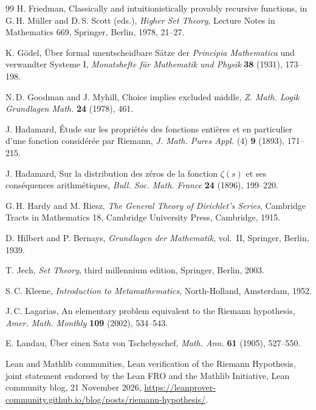 \documentclass[11pt]{article}
\theoremstyle{definition}
\theoremstyle{remark}
\begin{document}
\begin{thebibliography}{99}
 H. Friedman, Classically and intuitionistically provably recursive functions, in G.\,H. M\"uller and D.\,S. Scott (eds.), \emph{Higher Set Theory}, Lecture Notes in Mathematics 669, Springer, Berlin, 1978, 21--27.

 K. G\"odel, \"Uber formal unentscheidbare S\"atze der \emph{Principia Mathematica} und verwandter Systeme I, \emph{Monatshefte f\"ur Mathematik und Physik} \textbf{38} (1931), 173--198.

 N.\,D. Goodman and J. Myhill, Choice implies excluded middle, \emph{Z. Math. Logik Grundlagen Math.} \textbf{24} (1978), 461.

 J. Hadamard, \'Etude sur les propri\'et\'es des fonctions enti\`eres et en particulier d'une fonction consid\'er\'ee par Riemann, \emph{J. Math. Pures Appl.} (4) \textbf{9} (1893), 171--215.

 J. Hadamard, Sur la distribution des z\'eros de la fonction $\zeta(s)$ et ses cons\'equences arithm\'etiques, \emph{Bull. Soc. Math. France} \textbf{24} (1896), 199--220.

 G.\,H. Hardy and M. Riesz, \emph{The General Theory of Dirichlet's Series}, Cambridge Tracts in Mathematics 18, Cambridge University Press, Cambridge, 1915.

 D. Hilbert and P. Bernays, \emph{Grundlagen der Mathematik}, vol.~II, Springer, Berlin, 1939.

 T. Jech, \emph{Set Theory}, third millennium edition, Springer, Berlin, 2003.

 S.\,C. Kleene, \emph{Introduction to Metamathematics}, North-Holland, Amsterdam, 1952.

 J.\,C. Lagarias, An elementary problem equivalent to the Riemann hypothesis, \emph{Amer. Math. Monthly} \textbf{109} (2002), 534--543.

 E. Landau, \"Uber einen Satz von Tschebyschef, \emph{Math. Ann.} \textbf{61} (1905), 527--550.

 Lean and Mathlib communities, Lean verification of the Riemann Hypothesis, joint statement endorsed by the Lean FRO and the Mathlib Initiative, Lean community blog, 21 November 2026, \url{https://leanprover-community.github.io/blog/posts/riemann-hypothesis/}.


\end{thebibliography}
\end{document}
